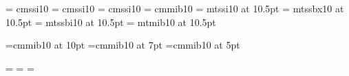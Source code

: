 %
\def\ssC{\mbox{\sf C}}         %
\def\sfsP{\mbox{\sfs P}}       %
\def\slsQ{\mbox{\sls Q}}       %
%
\makeatletter
\ifx\CUP@mtlplain@loaded\undefined
  \font\sfs = cmssi10    %
  \font\sfb = cmssi10    %
  \font\sls = cmssi10    %
  \font\bit = cmmib10    %
\else
  \font\sfs = mtssi10 at 10.5pt   %
  \font\sfb = mtssbx10 at 10.5pt  %
  \font\sls = mtssbi10 at 10.5pt  %
  \font\bit = mtmib10 at 10.5pt   %
\fi
\makeatother
%


%
  \def\hatp{\skew5\hat{p}}        %


%
%
 \makeatletter
 \ifx\CUP@mtlplain@loaded\undefined
   \font\tenbmi=cmmib10 at 10pt
   \font\sevenbmi=cmmib10 at 7pt
   \font\fivebmi=cmmib10 at 5pt

   \newfam\bmifam
   \textfont\bmifam=\tenbmi
   \scriptfont\bmifam=\sevenbmi
   \scriptscriptfont\bmifam=\fivebmi
   \def\bmi{\fam\bmifam\tenbmi}
 \fi
 \makeatother
%



\newsavebox{\thalfbox}
\newcommand{\thalf}{\usebox{\thalfbox}}

\newsavebox{\shalfbox}
\newcommand{\shalf}{\usebox{\shalfbox}}

\newsavebox{\squartbox}
\newcommand{\squart}{\usebox{\squartbox}}

\newsavebox{\etbox}
\sbox{\etbox}{\boldmath$\eta$}
\newcommand{\etb}{\usebox{\etbox}}

\newsavebox{\biSbox}
\newcommand{\biS}{\usebox{\biSbox}}

